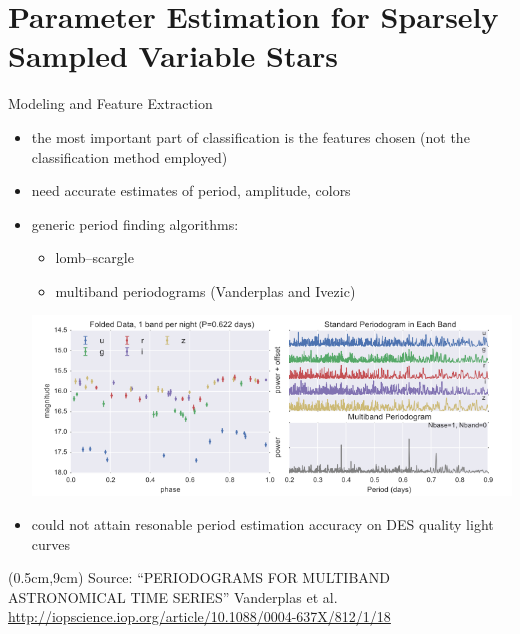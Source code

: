 \documentclass[12pt]{beamer}
\newcommand{\att}[1]{\begin{textblock*}{12cm}(0.5cm,9cm) %
  {\tiny Source: #1}
      \end{textblock*}}
\begin{document}



\section{Parameter Estimation for Sparsely Sampled Variable Stars}


\begin{frame}{Modeling and Feature Extraction}

  \vspace{-.1in}
  
  \begin{itemize}
  \item the most important part of classification is the features chosen (not the classification method employed)
  \item need accurate estimates of period, amplitude, colors
  \item generic period finding algorithms:
    \begin{itemize}
    \item lomb--scargle
    \item multiband periodograms (Vanderplas and Ivezic)
    \end{itemize}
  \begin{center}
    \includegraphics[scale=0.35]{figs/vanderplas_periodogram.png}
  \end{center}
  \vspace{-.15in}
\item could not attain resonable period estimation accuracy on DES quality light curves
  \end{itemize}
  
  \att{``PERIODOGRAMS FOR MULTIBAND ASTRONOMICAL TIME SERIES'' Vanderplas et al. \url{http://iopscience.iop.org/article/10.1088/0004-637X/812/1/18}\\}
\end{frame}
\end{document}

